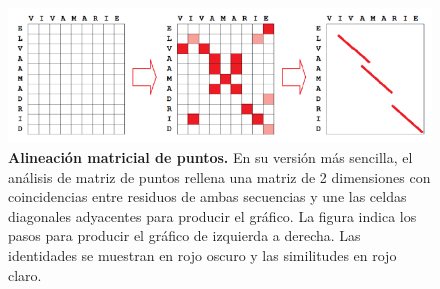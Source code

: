 \begin{figure}[htbp]
\centering
\includegraphics[width = \textwidth]{figs/dot-plot.png}
\caption{\textbf{Alineación matricial de puntos.} En su versión más sencilla, el análisis de matriz de puntos rellena una matriz de 2 dimensiones con coincidencias entre residuos de ambas secuencias y une las celdas diagonales adyacentes para producir el gráfico. La figura indica los pasos para producir el gráfico de izquierda a derecha. Las identidades se muestran en rojo oscuro y las similitudes en rojo claro.}
\label{fig:dotplot}
\end{figure}

